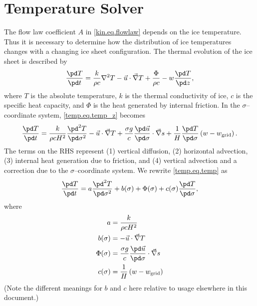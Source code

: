 \section{Temperature Solver}
\label{sc:glide_temp_solver}
The flow law coefficient $A$ in \eqref{kin.eq.flowlaw} depends on the ice temperature. Thus it is necessary to determine how the distribution of ice temperatures changes with a changing ice sheet configuration. The thermal evolution of the ice sheet is described by
\begin{equation}
  \label{temp.eq.temp_z}
  \frac{\pd T}{\pd t}=\frac{k}{\rho c}\nabla^2T-\vec{u}\cdot\vec\nabla T+\frac\Phi{\rho c}-w\frac{\pd T}{\pd z},
\end{equation}
where $T$ is the absolute temperature, $k$ is the thermal conductivity of ice, $c$ is the specific heat capacity, and $\Phi$ is the heat generated by internal friction. In the $\sigma$--coordinate system, \eqref{temp.eq.temp_z} becomes
\begin{equation}
  \label{temp.eq.temp}
  \frac{\pd T}{\pd t} = \frac{k}{\rho cH^2}\frac{\pd^2T}{\pd\sigma^2} - \vec{u}\cdot\vec\nabla T + \frac{\sigma g}c\frac{\pd \vec{u}}{\pd\sigma}\cdot\vec\nabla s + \frac1H\frac{\pd T}{\pd\sigma}\left(w-w_{\text{grid}}\right).
\end{equation}
The terms on the RHS represent (1) vertical diffusion, (2) horizontal advection, (3) internal heat generation due to friction, and (4) vertical advection and a correction due to the $\sigma$--coordinate system. We rewrite \eqref{temp.eq.temp} as
\begin{equation}
  \label{temp.eq.temp2}
  \frac{\pd T}{\pd t} = a\frac{\pd^2T}{\pd\sigma^2} +b(\sigma) + \Phi(\sigma) + c(\sigma)\frac{\pd T}{\pd\sigma},
\end{equation}
where
\begin{subequations}
  \begin{align}
    a&=\frac{k}{\rho cH^2} \\
    \label{temp.eq.hadv}
    b(\sigma)&=-\vec{u}\cdot\vec\nabla T\\
    \Phi(\sigma)&=\frac{\sigma g}c\frac{\pd \vec{u}}{\pd\sigma}\cdot\vec\nabla s \\
    c(\sigma)&=\frac1H\left(w-w_{\text{grid}}\right)
  \end{align}
\end{subequations}
(Note the different meanings for $b$ and $c$ here relative to usage elsewhere in this document.)

